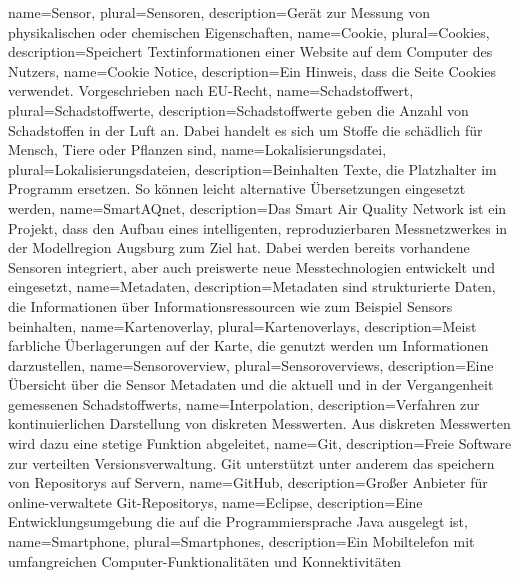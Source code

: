 \makenoidxglossaries
{}
{
	name=Sensor,
	plural=Sensoren,
	description={Gerät zur Messung von physikalischen oder chemischen Eigenschaften},
}
{
	name=Cookie,
	plural=Cookies,
	description={Speichert Textinformationen einer Website auf dem Computer des Nutzers},
}
{
	name=Cookie Notice,
	description={Ein Hinweis, dass die Seite Cookies verwendet. Vorgeschrieben nach EU-Recht},
}
{
	name=Schadstoffwert,
	plural=Schadstoffwerte,
	description={Schadstoffwerte geben die Anzahl von Schadstoffen in der Luft an. Dabei handelt es sich um Stoffe die schädlich für Mensch, Tiere oder Pflanzen sind},
}
{
	name=Lokalisierungsdatei,
	plural=Lokalisierungsdateien,
	description={Beinhalten Texte, die Platzhalter im Programm ersetzen. So können leicht alternative Übersetzungen eingesetzt werden},
}
{
	name=SmartAQnet,
	description={Das Smart Air Quality Network ist ein Projekt, dass den Aufbau eines intelligenten, reproduzierbaren Messnetzwerkes in der Modellregion Augsburg zum Ziel hat. Dabei werden bereits vorhandene Sensoren integriert, aber auch preiswerte neue Messtechnologien entwickelt und eingesetzt},
}
{
	name=Metadaten,
	description={Metadaten sind strukturierte Daten, die Informationen über Informationsressourcen wie zum Beispiel \glspl{Sensor} beinhalten},
}
{
	name=Kartenoverlay,
	plural=Kartenoverlays,
	description={Meist farbliche Überlagerungen auf der Karte, die genutzt werden um Informationen darzustellen},
}
{
	name=Sensoroverview,
	plural=Sensoroverviews,
	description={Eine Übersicht über die \gls{Sensor} \gls{Metadaten} und die aktuell und in der Vergangenheit gemessenen \glspl{Schadstoffwert}},
}
{
	name=Interpolation,
	description={Verfahren zur kontinuierlichen Darstellung von diskreten Messwerten. Aus diskreten Messwerten wird dazu eine stetige Funktion abgeleitet},
}
{
	name=Git,
	description={Freie Software zur verteilten Versionsverwaltung. Git unterstützt unter anderem das speichern von \glspl{Repository} auf Servern},
}
{
	name=GitHub,
	description={Großer Anbieter für online-verwaltete \gls{Git}-\glspl{Repository}},
}
{
	name=Eclipse,
	description={Eine Entwicklungsumgebung die auf die Programmiersprache Java ausgelegt ist},
}
{
	name=Smartphone,
	plural=Smartphones,
	description={Ein Mobiltelefon mit umfangreichen Computer-Funktionalitäten und Konnektivitäten}
}
